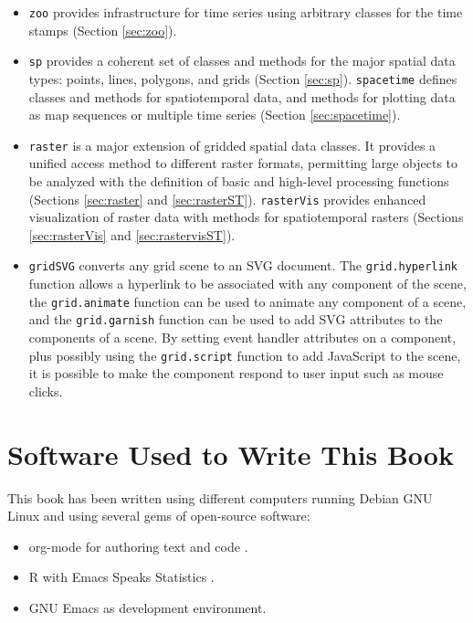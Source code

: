 \documentclass[smallroyalvopaper]{memoir}
\begin{document}
\begin{itemize}
\item \texttt{zoo} \cite{Zeileis.Grothendieck2005} provides infrastructure for time series using arbitrary classes for the time
stamps (Section \ref{sec:zoo}).

\item \texttt{sp} \cite{Pebesma2012} provides a coherent set of classes and methods for the major spatial data types: points, lines, polygons, and grids (Section \ref{sec:sp}). \texttt{spacetime} \cite{Pebesma2012} defines classes and methods for spatiotemporal  data, and methods for plotting data as map sequences or multiple time series (Section \ref{sec:spacetime}).

\item \texttt{raster} \cite{Hijmans2013} is a major extension of gridded spatial data classes. It provides a unified access method to different raster formats, permitting large objects to be analyzed with the definition of basic and high-level processing functions (Sections \ref{sec:raster} and \ref{sec:rasterST}). \texttt{rasterVis} \cite{Perpinan.Hijmans2013} provides enhanced visualization of raster data with methods for spatiotemporal rasters (Sections \ref{sec:rasterVis} and \ref{sec:rastervisST}).

\item \texttt{gridSVG} \cite{Murrell.Potter2013} converts any grid scene to an \textsf{SVG} document. The \texttt{grid.hyperlink} function allows a hyperlink to be associated with any component of the scene, the \texttt{grid.animate} function can be used to animate any component of a scene, and the \texttt{grid.garnish} function can be used to add \textsf{SVG} attributes to the components of a scene. By setting event handler attributes on a component, plus possibly using the \texttt{grid.script} function to add \textsf{JavaScript} to the scene, it is possible to make the component respond to user input such as mouse clicks.
\end{itemize}


\section{Software Used to Write This Book}
\label{sec:orgheadline10}
\label{sec:software-book}

This book has been written using different computers running Debian GNU Linux and using several gems of open-source software: 
\begin{itemize}
\item \textsf{org-mode} for authoring text and code \cite{Schulte.Davison.ea2012}.
\item \textsf{R} \cite{RDevelopmentCoreTeam2013} with \textsf{Emacs Speaks Statistics} \cite{Rossini.Heiberger.ea2004}.

\item \textsf{GNU Emacs} as development environment.
\end{itemize}
\end{document}
